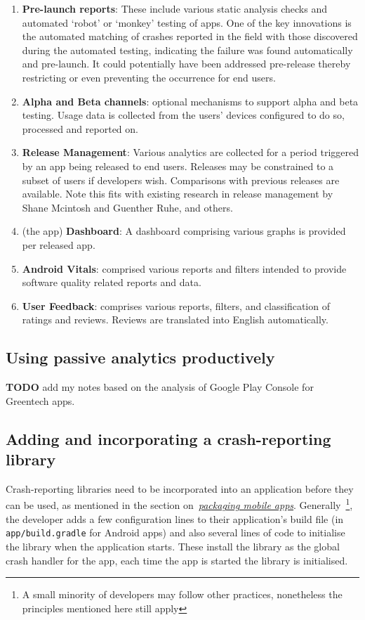 \begin{enumerate}
    \item \textbf{Pre-launch reports}: These include various static analysis checks and automated `robot' or `monkey' testing of apps. One of the key innovations is the automated matching of crashes reported in the field with those discovered during the automated testing, indicating the failure was found automatically and pre-launch. It could potentially have been addressed pre-release thereby restricting or even preventing the occurrence for end users.
    \item \textbf{Alpha and Beta channels}: optional mechanisms to support alpha and beta testing. Usage data is collected from the users' devices configured to do so, processed and reported on. 
    \item \textbf{Release Management}: Various analytics are collected for a period triggered by an app being released to end users. Releases may be constrained to a subset of users if developers wish. Comparisons with previous releases are available. Note this fits with existing research in release management by Shane Mcintosh and Guenther Ruhe, and others.
    \item (the app) \textbf{Dashboard}: A dashboard comprising various graphs is provided per released app.  
    \item \textbf{Android Vitals}: comprised various reports and filters intended to provide software quality related reports and data. 
    \item \textbf{User Feedback}: comprises various reports, filters, and classification of ratings and reviews. Reviews are translated into English automatically. 
\end{enumerate}

\subsection{Using passive analytics productively}

\textbf{TODO} add my notes based on the analysis of Google Play Console for Greentech apps.

\subsection{Adding and incorporating a crash-reporting library}
Crash-reporting libraries need to be incorporated into an application before they can be used, as mentioned in the section on~\href{section-packaging-mobile-apps}{\emph{packaging mobile apps}}. Generally~\footnote{A small minority of developers may follow other practices, nonetheless the principles mentioned here still apply}, the developer adds a few configuration lines to their application's build file (in \texttt{app/build.gradle} for Android apps) and also several lines of code to initialise the library when the application starts. These install the library as the global crash handler for the app, each time the app is started the library is initialised. 

